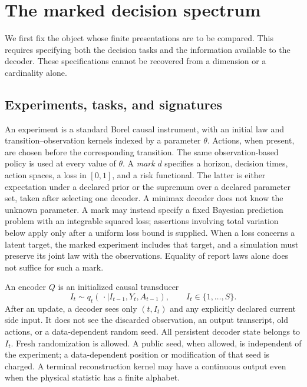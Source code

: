 \section{The marked decision spectrum}\label{sec:v8-spectrum}
We first fix the object whose finite presentations are to be compared.
This requires specifying both the decision tasks and the information
available to the decoder. These specifications cannot be recovered
from a dimension or a cardinality alone.

\subsection{Experiments, tasks, and signatures}
An experiment is a standard Borel causal instrument, with an initial law
and transition--observation kernels indexed by a parameter $\theta$.
Actions, when present, are chosen before the corresponding transition.
The same observation-based policy is used at every value of $\theta$.
A \emph{mark} $d$ specifies a horizon, decision times, action spaces, a
loss in $[0,1]$, and a risk functional. The latter is either expectation
under a declared prior or the supremum over a declared parameter set,
taken after selecting one decoder. A minimax decoder does not know the
unknown parameter. A mark may instead specify a fixed Bayesian
prediction problem with an integrable squared loss; assertions involving
total variation below apply only after a uniform loss bound is supplied.
When a loss concerns a latent target, the marked experiment includes that
target, and a simulation must preserve its joint law with the observations.
Equality of report laws alone does not suffice for such a mark.

An encoder $Q$ is an initialized causal transducer
\begin{equation}
 I_t\sim q_t(\,\cdot\mid I_{t-1},Y_t,A_{t-1}),
 \qquad I_t\in\{1,\ldots,S\}.                         \label{eq:v8-register}
\end{equation}
After an update, a decoder sees only $(t,I_t)$ and any explicitly
declared current side input. It does not see the discarded observation,
an output transcript, old actions, or a data-dependent random seed.
All persistent decoder state belongs to $I_t$. Fresh randomization is
allowed. A public seed, when allowed, is independent of the experiment;
a data-dependent position or modification of that seed is charged.
A terminal reconstruction kernel may have a continuous output even when
the physical statistic has a finite alphabet.

